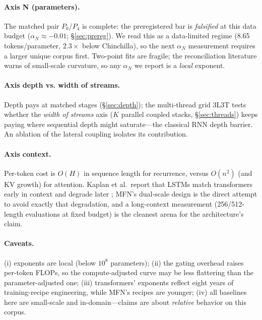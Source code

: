\documentclass[11pt]{article}
\begin{document}
\paragraph{Axis N (parameters).} The matched pair $P_0$/$P_4$ is complete:
the preregistered bar is \emph{falsified} at this data budget
($\alpha_N \approx -0.01$; \S\ref{sec:prereg}). We read this as a
data-limited regime (8.65 tokens/parameter, $2.3\times$ below Chinchilla),
so the next $\alpha_N$ measurement requires a larger unique corpus first.
Two-point fits are fragile; the reconciliation
literature \citep{pearce2024reconciling,porian2024data} warns of
small-scale curvature, so any $\alpha_N$ we report is a \emph{local}
exponent.
\paragraph{Axis depth vs. width of streams.} Depth pays at matched stages
(\S\ref{sec:depth}); the multi-thread grid 3L3T tests whether the
\emph{width of streams} axis ($K$ parallel coupled stacks, \S\ref{sec:threads})
keeps paying where sequential depth might saturate---the classical RNN depth
barrier. An ablation of the lateral coupling isolates its contribution.
\paragraph{Axis context.} Per-token cost is $O(H)$ in sequence length for
recurrence, versus $O(n^2)$ (and KV growth) for attention. Kaplan et al.\
report that LSTMs match transformers early in context and degrade later
\citep{kaplan2020scaling}; MFN's dual-scale design is the direct attempt to
avoid exactly that degradation, and a long-context measurement
(256/512-length evaluations at fixed budget) is the cleanest arena for the
architecture's claim.
\paragraph{Caveats.} (i) exponents are local (below $10^8$ parameters);
(ii) the gating overhead raises per-token FLOPs, so the compute-adjusted
curve may be less flattering than the parameter-adjusted one; (iii)
transformers' exponents reflect eight years of training-recipe engineering,
while MFN's recipes are younger; (iv) all baselines here are small-scale and
in-domain---claims are about \emph{relative} behavior on this corpus.
\end{document}
